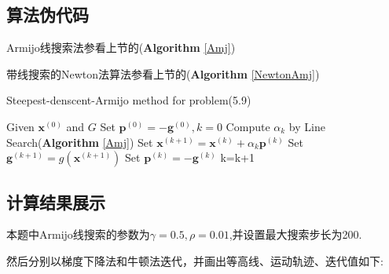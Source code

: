 \subsection{算法伪代码}
Armijo线搜索法参看上节的(\textbf{Algorithm} \ref{Amj})

带线搜索的Newton法算法参看上节的(\textbf{Algorithm} \ref{NewtonAmj})

\begin{algorithm}[h]  
\caption{Steepest-denscent-Armijo method for problem(5.9)}  
\begin{algorithmic}[1]  
\STATE Given $\bm{x}^{(0)}$ and $G$
\STATE Set $\bm{p}^{(0)}=-\bm{g}^{(0)},k=0$
\STATE Compute $\alpha_k$ by Line Search(\textbf{Algorithm} \ref{Amj})
\STATE Set $\bm{x}^{(k+1)}=\bm{x}^{(k)}+\alpha_k\bm{p}^{(k)}$
\STATE Set $\bm{g}^{(k+1)}=g(\bm{x}^{(k+1)})$
\STATE Set $\bm{p}^{(k)}=-\bm{g}^{(k)}$
\STATE k=k+1
\ENDWHILE
\end{algorithmic}  
\end{algorithm}



\subsection{计算结果展示}

本题中Armijo线搜索的参数为$\gamma=0.5,\rho=0.01$,并设置最大搜索步长为200.

然后分别以梯度下降法和牛顿法迭代，并画出等高线、运动轨迹、迭代值如下:

